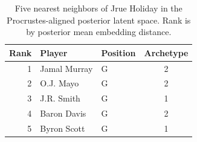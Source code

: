 \begin{table}[htbp]
  \centering\small
  \begin{tabular}{rllc}
    \toprule
    Rank & Player & Position & Archetype \\
    \midrule
    1 & Jamal Murray & G & 2 \\
    2 & O.J. Mayo & G & 2 \\
    3 & J.R. Smith & G & 1 \\
    4 & Baron Davis & G & 2 \\
    5 & Byron Scott & G & 1 \\
    \bottomrule
  \end{tabular}
  \caption{Five nearest neighbors of Jrue Holiday in the Procrustes-aligned posterior latent space. Rank is by posterior mean embedding distance.}
  \label{tab:Jrue_Holiday_neighbors}
\end{table}

